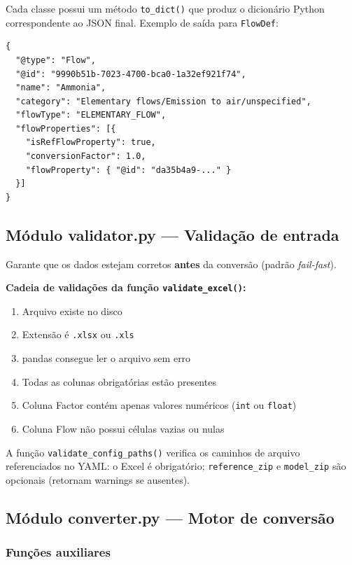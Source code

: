 Cada classe possui um m\'etodo \texttt{to\_dict()} que produz o dicion\'ario Python correspondente ao JSON final. Exemplo de sa\'ida para \texttt{FlowDef}:

\begin{lstlisting}[style=json]
{
  "@type": "Flow",
  "@id": "9990b51b-7023-4700-bca0-1a32ef921f74",
  "name": "Ammonia",
  "category": "Elementary flows/Emission to air/unspecified",
  "flowType": "ELEMENTARY_FLOW",
  "flowProperties": [{
    "isRefFlowProperty": true,
    "conversionFactor": 1.0,
    "flowProperty": { "@id": "da35b4a9-..." }
  }]
}
\end{lstlisting}

\subsection{M\'odulo validator.py --- Valida\c{c}\~ao de entrada}

Garante que os dados estejam corretos \textbf{antes} da convers\~ao (padr\~ao \textit{fail-fast}).

\textbf{Cadeia de valida\c{c}\~oes da fun\c{c}\~ao \texttt{validate\_excel()}:}

\begin{enumerate}
    \item Arquivo existe no disco
    \item Extens\~ao \'e \texttt{.xlsx} ou \texttt{.xls}
    \item pandas consegue ler o arquivo sem erro
    \item Todas as colunas obrigat\'orias est\~ao presentes
    \item Coluna Factor cont\'em apenas valores num\'ericos (\texttt{int} ou \texttt{float})
    \item Coluna Flow n\~ao possui c\'elulas vazias ou nulas
\end{enumerate}

A fun\c{c}\~ao \texttt{validate\_config\_paths()} verifica os caminhos de arquivo referenciados no YAML: o Excel \'e obrigat\'orio; \texttt{reference\_zip} e \texttt{model\_zip} s\~ao opcionais (retornam warnings se ausentes).

\subsection{M\'odulo converter.py --- Motor de convers\~ao}

\subsubsection{Fun\c{c}\~oes auxiliares}

